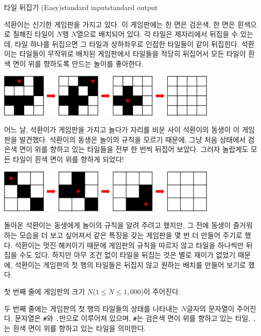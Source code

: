 \begin{problem}{타일 뒤집기 (Easy)}{standard input}{standard output}

석환이는 신기한 게임판을 가지고 있다. 이 게임판에는 한 면은 검은색, 한 면은 흰색으로 칠해진 타일이 $N$행 $N$열으로 배치되어 있다. 각 타일은 제자리에서 뒤집을 수 있는데, 타일 하나를 뒤집으면 그 타일과 상하좌우로 인접한 타일들이 같이 뒤집힌다. 석환이는 타일들이 무작위로 배치된 게임판에서 타일들을 적당히 뒤집어서 모든 타일이 흰색 면이 위를 향하도록 만드는 놀이를 좋아한다.

\begin{center}
  \includegraphics[width=0.8\textwidth]{tile1.png}
\end{center}

어느 날, 석환이가 게임판을 가지고 놀다가 자리를 비운 사이 석환이의 동생이 이 게임판을 발견했다. 석환이의 동생은 놀이의 규칙을 모르기 때문에, 그냥 처음 상태에서 검은색 면이 위를 향하고 있는 타일들을 전부 한 번씩 뒤집어 보았다. 그러자 놀랍게도 모든 타일이 흰색 면이 위를 향하게 되었다!

\begin{center}
  \includegraphics[width=0.8\textwidth]{tile2.png}
\end{center}

돌아온 석환이는 동생에게 놀이의 규칙을 알려 주려고 했지만, 그 전에 동생이 즐거워하는 모습을 더 보고 싶어져서 같은 특징을 갖는 게임판을 몇 번 더 만들어 주기로 했다. 석환이는 멋진 해커이기 때문에 게임판의 규칙을 따르지 않고 타일을 하나씩만 뒤집을 수도 있다. 하지만 아무 조건 없이 타일을 뒤집는 것은 별로 재미가 없었기 때문에, 석환이는 게임판의 첫 행의 타일들은 뒤집지 않고 원하는 배치를 만들어 보기로 했다.

\InputFile
첫 번째 줄에 게임판의 크기 $N$($1 \le N \le 1,000$)이 주어진다.

두 번째 줄에는 게임판의 첫 행의 타일들의 상태를 나타내는 $N$글자의 문자열이 주어진다. 문자열은 \texttt{\#}와 \texttt{.}만으로 이루어져 있으며, \texttt{\#}는 검은색 면이 위를 향하고 있는 타일, \texttt{.}는 흰색 면이 위를 향하고 있는 타일을 의미한다.


\end{problem}
